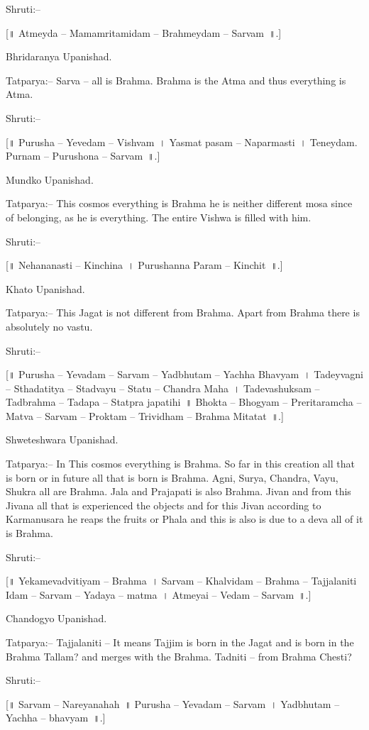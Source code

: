 Shruti:–

[॥ Atmeyda – Mamamritamidam – Brahmeydam – Sarvam~॥.]

Bhridaranya Upanishad.

Tatparya:– Sarva – all is Brahma. Brahma is the Atma and thus everything is Atma.

Shruti:–

[॥ Purusha – Yevedam – Vishvam~। Yasmat pasam – Naparmasti~। Teneydam. Purnam – Purushona – Sarvam~॥.]

Mundko Upanishad.

Tatparya:– This cosmos everything is Brahma he is neither different mosa since of belonging, as he is everything. The entire Vishwa is filled with him.

Shruti:–

[॥ Nehananasti – Kinchina~। Purushanna Param – Kinchit~॥.]

Khato Upanishad.

Tatparya:– This Jagat is not different from Brahma. Apart from Brahma there is absolutely no vastu.

Shruti:–

[॥ Purusha – Yevadam – Sarvam – Yadbhutam – Yachha Bhavyam~। Tadeyvagni – Sthadatitya – Stadvayu – Statu – Chandra Maha~। Tadevashuksam – Tadbrahma – Tadapa – Statpra japatihi~॥ Bhokta – Bhogyam – Preritaramcha – Matva – Sarvam – Proktam – Trividham – Brahma Mitatat~॥.]

Shweteshwara Upanishad.

Tatparya:– In This cosmos everything is Brahma. So far in this creation all that is born or in future all that is born is Brahma. Agni, Surya, Chandra, Vayu, Shukra all are Brahma. Jala and Prajapati is also Brahma. Jivan and from this Jivana all that is experienced the objects and for this Jivan according to Karmanusara he reaps the fruits or Phala and this is also is due to a deva all of it is Brahma.

Shruti:–

[॥ Yekamevadvitiyam – Brahma~। Sarvam – Khalvidam – Brahma – Tajjalaniti Idam – Sarvam – Yadaya – matma~। Atmeyai – Vedam – Sarvam~॥.]

Chandogyo Upanishad.

Tatparya:– Tajjalaniti – It means Tajjim is born in the Jagat and is born in the Brahma Tallam? and merges with the Brahma. Tadniti – from Brahma Chesti?

Shruti:–

[॥ Sarvam – Nareyanahah~॥ Purusha – Yevadam – Sarvam~। Yadbhutam – Yachha – bhavyam~॥.]

